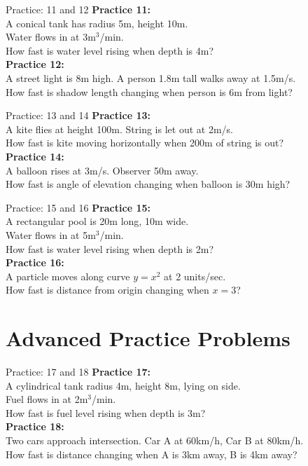 \documentclass[aspectratio=169]{beamer}
\begin{document}
\begin{frame}{Practice: 11 and 12}
\textbf{Practice 11:} \\
A conical tank has radius 5m, height 10m. \\
Water flows in at 3m$^3$/min. \\
How fast is water level rising when depth is 4m? \\
\vspace{1em}
\textbf{Practice 12:} \\
A street light is 8m high. A person 1.8m tall walks away at 1.5m/s. \\
How fast is shadow length changing when person is 6m from light?
\end{frame}

\begin{frame}{Practice: 13 and 14}
\textbf{Practice 13:} \\
A kite flies at height 100m. String is let out at 2m/s. \\
How fast is kite moving horizontally when 200m of string is out? \\
\vspace{1em}
\textbf{Practice 14:} \\
A balloon rises at 3m/s. Observer 50m away. \\
How fast is angle of elevation changing when balloon is 30m high?
\end{frame}

\begin{frame}{Practice: 15 and 16}
\textbf{Practice 15:} \\
A rectangular pool is 20m long, 10m wide. \\
Water flows in at 5m$^3$/min. \\
How fast is water level rising when depth is 2m? \\
\vspace{1em}
\textbf{Practice 16:} \\
A particle moves along curve $y = x^2$ at 2 units/sec. \\
How fast is distance from origin changing when $x = 3$?
\end{frame}

\section{Advanced Practice Problems}

\begin{frame}{Practice: 17 and 18}
\textbf{Practice 17:} \\
A cylindrical tank radius 4m, height 8m, lying on side. \\
Fuel flows in at 2m$^3$/min. \\
How fast is fuel level rising when depth is 3m? \\
\vspace{1em}
\textbf{Practice 18:} \\
Two cars approach intersection. Car A at 60km/h, Car B at 80km/h. \\
How fast is distance changing when A is 3km away, B is 4km away?
\end{frame}
\end{document}

